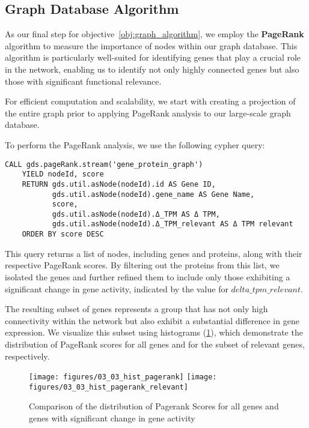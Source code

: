 \subsection{Graph Database Algorithm} \label{subsec:graph_database_algo}
As our final step for objective~\ref{obj:graph_algorithm},
we employ the \textbf{PageRank} algorithm to measure the importance of nodes within our graph database.
This algorithm is particularly well-suited for identifying genes that play a crucial role in the network,
enabling us to identify not only highly connected genes but also those with significant functional relevance.

For efficient computation and scalability,
we start with creating a projection of the entire graph prior to applying PageRank analysis to our large-scale graph database.

To perform the PageRank analysis, we use the following cypher query:
\begin{lstlisting}[language=Cypher, label={lst:pagerank}]
    CALL gds.pageRank.stream('gene_protein_graph')
    YIELD nodeId, score
    RETURN gds.util.asNode(nodeId).id AS Gene ID,
           gds.util.asNode(nodeId).gene_name AS Gene Name,
           score,
           gds.util.asNode(nodeId).Δ_TPM AS Δ TPM,
           gds.util.asNode(nodeId).Δ_TPM_relevant AS Δ TPM relevant
    ORDER BY score DESC
\end{lstlisting}

This query returns a list of nodes, including genes and proteins, along with their respective PageRank scores.
By filtering out the proteins from this list, we isolated the genes and
further refined them to include only those exhibiting a significant change in gene activity,
indicated by the value for $delta\_tpm\_relevant$.

The resulting subset of genes represents a group that has not only high connectivity
within the network but also exhibit a substantial difference in gene expression.
We visualize this subset using histograms (\cref{fig:03_02_hist_pagerank}),
which demonstrate the distribution of PageRank scores for all genes and for the subset of relevant genes, respectively.

\begin{figure}[h]
        \texttt{[image: figures/03\_03\_hist\_pagerank]}
    \endminipage
    \hfill
      \texttt{[image: figures/03\_03\_hist\_pagerank\_relevant]}
    \endminipage
    \caption{Comparison of the distribution of Pagerank Scores for all genes and genes with significant change in gene activity}
    \label{fig:03_02_hist_pagerank}
\end{figure}

